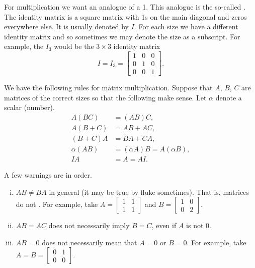 \documentclass[12pt]{book}
\begin{document}
\medskip

For multiplication we want an analogue of a 1.  This analogue is the
so-called \emph{}.
The identity matrix is a square matrix with 1s on the
main diagonal and zeros everywhere else.  It is usually denoted by $I$.
For each size we have a different identity matrix and so sometimes we may denote
the size as a subscript.  For example, the $I_3$ would be the $3 \times 3$
identity matrix
\begin{equation*}
I = I_3 =
\begin{bmatrix}
1 & 0 & 0 \\
0 & 1 & 0 \\
0 & 0 & 1
\end{bmatrix} .
\end{equation*}

We have the following rules for matrix multiplication.  Suppose that
$A$, $B$, $C$ are matrices of the correct sizes so that the following
make sense.  Let $\alpha$ denote a scalar (number).
\begin{align*}
A(BC) & = (AB)C, \\
A(B+C) & = AB + AC, \\
(B+C)A & = BA + CA, \\
\alpha(AB) & = (\alpha A)B = A(\alpha B), \\
IA & = A = AI .
\end{align*}

A few warnings are in order.
\begin{enumerate}[(i)]
\item $AB \not= BA$ in general (it may be true by fluke sometimes).  That is,
matrices do not .
For example, take
$A = \left[ \begin{smallmatrix} 1 & 1 \\ 1 & 1 \end{smallmatrix} \right]$
and
$B = \left[ \begin{smallmatrix} 1 & 0 \\ 0 & 2 \end{smallmatrix} \right]$.
\item $AB = AC$ does not necessarily imply $B=C$, even if $A$ is not 0.
\item $AB = 0$ does not necessarily mean that $A=0$ or $B=0$.
For example, take
$A = B = \left[ \begin{smallmatrix} 0 & 1 \\ 0 & 0 \end{smallmatrix}
\right]$.
\end{enumerate}
\end{document}
